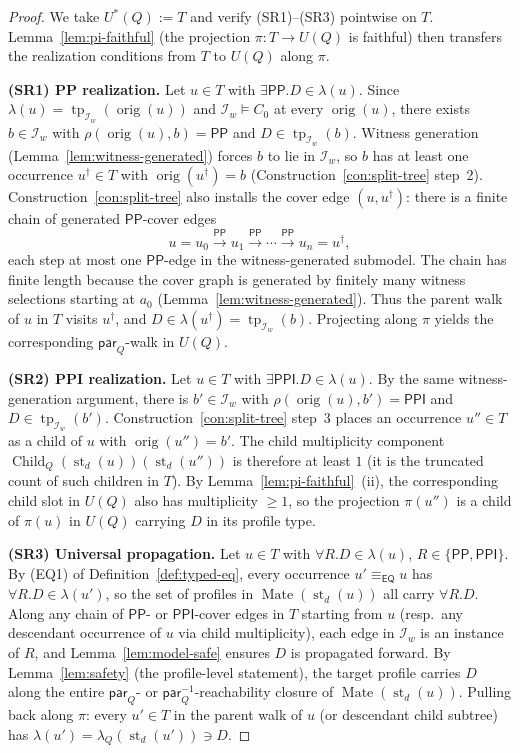 \documentclass[11pt]{article}
\theoremstyle{definition}
\theoremstyle{remark}
\newcommand{\PP}{\mathsf{PP}}
\newcommand{\PPI}{\mathsf{PPI}}
\newcommand{\EQ}{\mathsf{EQ}}
\newcommand{\tp}{\operatorname{tp}}
\newcommand{\st}{\operatorname{st}}
\newcommand{\orig}{\operatorname{orig}}
\newcommand{\Child}{\operatorname{Child}}
\newcommand{\eqcong}{\equiv_{\EQ}}
\newcommand{\Mate}{\operatorname{Mate}}
\begin{document}
\begin{proof}
We take $U^\ast(Q):=T$ and verify (SR1)--(SR3) pointwise on $T$.
Lemma~\ref{lem:pi-faithful} (the projection $\pi : T \to U(Q)$ is
faithful) then transfers the realization conditions from $T$ to
$U(Q)$ along $\pi$.

\smallskip\noindent\textbf{(SR1) PP realization.}\;
Let $u\in T$ with $\exists\PP.D\in\lambda(u)$.  Since $\lambda(u) =
\tp_{\mathcal{I}_w}(\orig(u))$ and $\mathcal{I}_w\models C_0$ at every
$\orig(u)$, there exists $b\in\mathcal{I}_w$ with
$\rho(\orig(u),b)=\PP$ and $D\in\tp_{\mathcal{I}_w}(b)$.  Witness
generation (Lemma~\ref{lem:witness-generated}) forces $b$ to lie in
$\mathcal{I}_w$, so $b$ has at least one occurrence $u^{\dagger}\in T$
with $\orig(u^{\dagger}) = b$
(Construction~\ref{con:split-tree} step~2).
Construction~\ref{con:split-tree} also installs the cover edge
$(u, u^{\dagger})$: there is a finite chain of generated $\PP$-cover
edges
\[
u = u_0 \xrightarrow{\PP} u_1 \xrightarrow{\PP} \cdots \xrightarrow{\PP}
u_n = u^{\dagger},
\]
each step at most one $\PP$-edge in the witness-generated submodel.
The chain has finite length because the cover graph is generated by
finitely many witness selections starting at $a_0$
(Lemma~\ref{lem:witness-generated}).  Thus the parent walk of $u$ in
$T$ visits $u^{\dagger}$, and $D\in\lambda(u^{\dagger})=\tp_{\mathcal{I}_w}(b)$.
Projecting along $\pi$ yields the corresponding $\mathsf{par}_Q$-walk
in $U(Q)$.

\smallskip\noindent\textbf{(SR2) PPI realization.}\;
Let $u\in T$ with $\exists\PPI.D\in\lambda(u)$.  By the same
witness-generation argument, there is $b'\in\mathcal{I}_w$ with
$\rho(\orig(u),b')=\PPI$ and $D\in\tp_{\mathcal{I}_w}(b')$.
Construction~\ref{con:split-tree} step~3 places an occurrence
$u''\in T$ as a child of $u$ with $\orig(u'')=b'$.  The child
multiplicity component
$\Child_Q(\st_d(u))(\st_d(u''))$ is therefore at least $1$ (it is
the truncated count of such children in $T$).  By
Lemma~\ref{lem:pi-faithful}~(ii), the corresponding child slot in
$U(Q)$ also has multiplicity $\ge 1$, so the projection
$\pi(u'')$ is a child of $\pi(u)$ in $U(Q)$ carrying $D$ in its
profile type.

\smallskip\noindent\textbf{(SR3) Universal propagation.}\;
Let $u\in T$ with $\forall R.D \in \lambda(u)$, $R\in\{\PP,\PPI\}$.
By (EQ1) of Definition~\ref{def:typed-eq}, every occurrence
$u'\eqcong u$ has $\forall R.D \in \lambda(u')$, so the set of
profiles in $\Mate(\st_d(u))$ all carry $\forall R.D$.  Along any
chain of $\PP$- or $\PPI$-cover edges in $T$ starting from $u$ (resp.\
any descendant occurrence of $u$ via child multiplicity), each
edge in $\mathcal{I}_w$ is an instance of $R$, and
Lemma~\ref{lem:model-safe} ensures $D$ is propagated forward.  By
Lemma~\ref{lem:safety} (the profile-level statement), the target
profile carries $D$ along the entire $\mathsf{par}_Q$- or
$\mathsf{par}_Q^{-1}$-reachability closure of $\Mate(\st_d(u))$.
Pulling back along $\pi$: every $u'\in T$ in the parent walk of $u$
(or descendant child subtree) has
$\lambda(u') = \lambda_Q(\st_d(u'))\ni D$.


\end{proof}
\end{document}
